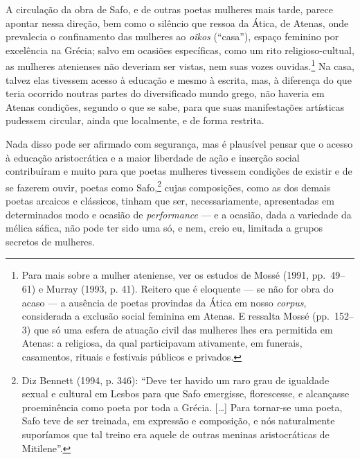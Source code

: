 A circulação da obra de Safo, e de outras poetas mulheres mais tarde, parece
apontar nessa direção, bem como o silêncio que ressoa da Ática, de Atenas, onde
prevalecia o confinamento das mulheres ao \textit{oîkos} (“casa”), espaço
feminino por excelência na Grécia; salvo em ocasiões específicas, como um rito
religioso-cultual, as mulheres atenienses não deveriam ser vistas, nem suas
vozes ouvidas.\footnote{ Para mais sobre a mulher ateniense, ver os estudos de
Mossé (1991, pp.~49--61) e Murray (1993, p. 41). Reitero que é eloquente --- se
não for obra do acaso --- a ausência de poetas provindas da Ática em nosso
\textit{corpus}, considerada a exclusão social feminina em Atenas. E ressalta
Mossé (pp.~152--3) que só uma esfera de atuação civil das mulheres lhes era
permitida em Atenas: a religiosa, da qual participavam ativamente, em funerais,
casamentos, rituais e festivais públicos e privados.} Na casa, talvez elas
tivessem acesso à educação e mesmo à escrita, mas, à diferença do que teria
ocorrido noutras partes do diversificado mundo grego, não haveria em Atenas
condições, segundo o que se sabe, para que suas manifestações artísticas
pudessem circular, ainda que localmente, e de forma restrita.

Nada disso pode ser afirmado com segurança, mas é plausível pensar que o acesso
à educação aristocrática e a maior liberdade de ação e inserção social
contribuíram e muito para que poetas mulheres tivessem condições de existir e
de se fazerem ouvir, poetas como Safo,\footnote{ Diz Bennett (1994, p. 346):
“Deve ter havido um raro grau de igualdade sexual e cultural em Lesbos para que
Safo emergisse, florescesse, e alcançasse proeminência como poeta por toda a
Grécia. [\ldots{}] Para tornar-se uma poeta, Safo teve de ser treinada, em expressão
e composição, e nós naturalmente suporíamos que tal treino era aquele de outras
meninas aristocráticas de Mitilene”.} cujas composições, como as dos demais
poetas arcaicos e clássicos, tinham que ser, necessariamente, apresentadas em
determinados modo e ocasião de \textit{performance} --- e a ocasião, dada a
variedade da mélica sáfica, não pode ter sido uma só, e nem, creio eu, limitada
a grupos secretos de mulheres. 

